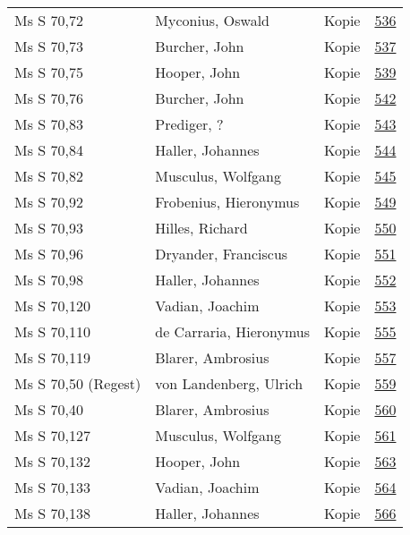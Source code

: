 \documentclass[10pt,a4paper,landscape]{report}
\begin{document}
\begin{longtable}{p{16cm}p{4cm}lr}
Ms S 70,72	&	Myconius, Oswald	&	Kopie	&	\href{http://130.60.24.72/assignment/536}{536}\\
Ms S 70,73	&	Burcher, John	&	Kopie	&	\href{http://130.60.24.72/assignment/537}{537}\\
Ms S 70,75	&	Hooper, John	&	Kopie	&	\href{http://130.60.24.72/assignment/539}{539}\\
Ms S 70,76	&	Burcher, John	&	Kopie	&	\href{http://130.60.24.72/assignment/542}{542}\\
Ms S 70,83	&	Prediger, ?	&	Kopie	&	\href{http://130.60.24.72/assignment/543}{543}\\
Ms S 70,84	&	Haller, Johannes	&	Kopie	&	\href{http://130.60.24.72/assignment/544}{544}\\
Ms S 70,82	&	Musculus, Wolfgang	&	Kopie	&	\href{http://130.60.24.72/assignment/545}{545}\\
Ms S 70,92	&	Frobenius, Hieronymus	&	Kopie	&	\href{http://130.60.24.72/assignment/549}{549}\\
Ms S 70,93	&	Hilles, Richard	&	Kopie	&	\href{http://130.60.24.72/assignment/550}{550}\\
Ms S 70,96	&	Dryander, Franciscus	&	Kopie	&	\href{http://130.60.24.72/assignment/551}{551}\\
Ms S 70,98	&	Haller, Johannes	&	Kopie	&	\href{http://130.60.24.72/assignment/552}{552}\\
Ms S 70,120	&	Vadian, Joachim	&	Kopie	&	\href{http://130.60.24.72/assignment/553}{553}\\
Ms S 70,110	&	de Carraria, Hieronymus	&	Kopie	&	\href{http://130.60.24.72/assignment/555}{555}\\
Ms S 70,119	&	Blarer, Ambrosius	&	Kopie	&	\href{http://130.60.24.72/assignment/557}{557}\\
Ms S 70,50 (Regest)	&	von Landenberg, Ulrich	&	Kopie	&	\href{http://130.60.24.72/assignment/559}{559}\\
Ms S 70,40	&	Blarer, Ambrosius	&	Kopie	&	\href{http://130.60.24.72/assignment/560}{560}\\
Ms S 70,127	&	Musculus, Wolfgang	&	Kopie	&	\href{http://130.60.24.72/assignment/561}{561}\\
Ms S 70,132	&	Hooper, John	&	Kopie	&	\href{http://130.60.24.72/assignment/563}{563}\\
Ms S 70,133	&	Vadian, Joachim	&	Kopie	&	\href{http://130.60.24.72/assignment/564}{564}\\
Ms S 70,138	&	Haller, Johannes	&	Kopie	&	\href{http://130.60.24.72/assignment/566}{566}\\

\end{longtable}
\end{document}
